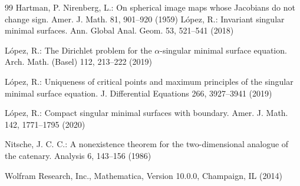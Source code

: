 \documentclass{birkjour}
\theoremstyle{definition}
\theoremstyle{remark}
\numberwithin{equation}{section}
\begin{document}
\begin{thebibliography}{99}
   Hartman, P.    Nirenberg, L.: On spherical image maps whose Jacobians do not change sign. Amer. J. Math. 81, 901--920 (1959)
   L\'opez, R.:  Invariant singular minimal surfaces.  Ann. Global Anal. Geom.      53, 521--541 (2018)

  L\'opez, R.:  The Dirichlet problem for the $\alpha$-singular minimal surface equation.  Arch. Math. (Basel)   112, 213--222 (2019)

  L\'opez, R.:  Uniqueness of critical points and maximum principles of the singular minimal surface equation.  J. Differential Equations    266, 3927--3941  (2019)

   L\'opez, R.: Compact singular minimal surfaces with boundary.  Amer. J. Math.     142,  1771--1795 (2020)
   

  Nitsche, J. C. C.:  A nonexistence theorem for the two-dimensional analogue of the catenary.  Analysis  6, 143--156 (1986)
 
 
 

 Wolfram Research, Inc., Mathematica, Version 10.0.0, Champaign, IL (2014)

 \end{thebibliography}
\end{document}
